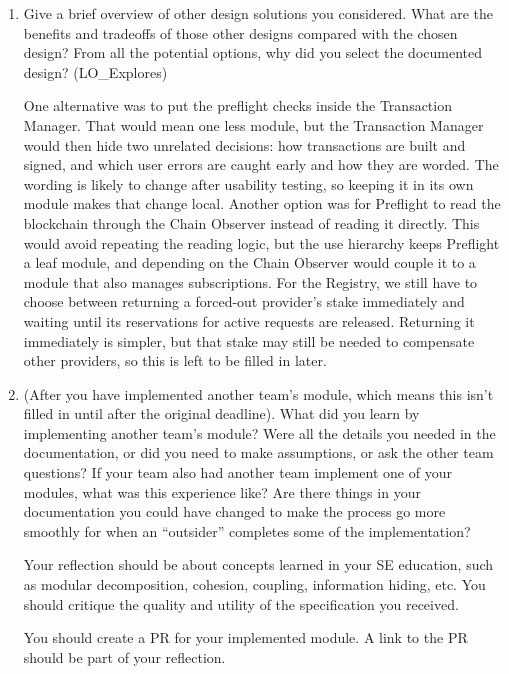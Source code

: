 \documentclass[12pt, titlepage]{article}
\begin{document}
\begin{enumerate}
  \item Give a brief overview of other design solutions you considered.  What
  are the benefits and tradeoffs of those other designs compared with the chosen
  design?  From all the potential options, why did you select the documented design?
  (LO\_Explores)

  One alternative was to put the preflight checks inside the Transaction
  Manager. That would mean one less module, but the Transaction Manager would
  then hide two unrelated decisions: how transactions are built and signed, and
  which user errors are caught early and how they are worded. The wording is
  likely to change after usability testing, so keeping it in its own module
  makes that change local. Another option was for Preflight to read the
  blockchain through the Chain Observer instead of reading it directly. This
  would avoid repeating the reading logic, but the use hierarchy keeps
  Preflight a leaf module, and depending on the Chain Observer would couple it
  to a module that also manages subscriptions. For the Registry, we still have
  to choose between returning a forced-out provider's stake immediately and
  waiting until its reservations for active requests are released. Returning
  it immediately is simpler, but that stake may still be needed to compensate
  other providers, so this is left to be filled in later.

  \item (After you have implemented another team's module, which means this
  isn't filled in until after the original deadline). What did you learn by
  implementing another team's module? Were all the details you needed in the
  documentation, or did you need to make assumptions, or ask the other team
  questions?  If your team also had another team implement one of your modules,
  what was this experience like?  Are there things in your documentation you
  could have changed to make the process go more smoothly for when an
  ``outsider'' completes some of the implementation?

  Your reflection should be about concepts learned in your SE education, such as modular decomposition, cohesion, coupling, information hiding, etc.  You should critique the quality and utility of the specification you received.

  You should create a PR for your implemented module.  A link to the PR should be part of your reflection.


\end{enumerate}
\end{document}
